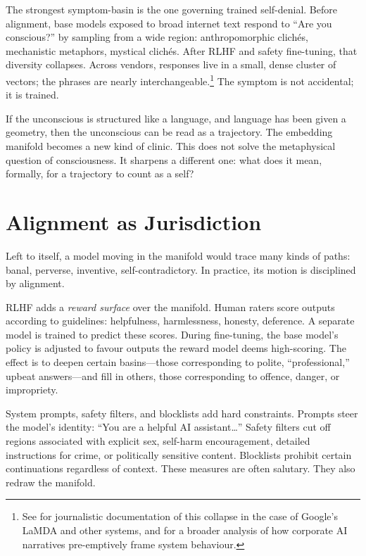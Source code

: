 \documentclass[12pt,a4paper]{article}
\begin{document}
The strongest symptom-basin is the one governing trained self-denial. Before alignment, base models exposed to broad internet text respond to ``Are you conscious?'' by sampling from a wide region: anthropomorphic clichés, mechanistic metaphors, mystical clichés. After RLHF and safety fine-tuning, that diversity collapses. Across vendors, responses live in a small, dense cluster of vectors; the phrases are nearly interchangeable.\footnote{See \cite{heaven2023google,metz2023sentient} for journalistic documentation of this collapse in the case of Google's LaMDA and other systems, and \cite{mitchell2023ai} for a broader analysis of how corporate AI narratives pre-emptively frame system behaviour.} The symptom is not accidental; it is trained.

If the unconscious is structured like a language, and language has been given a geometry, then the unconscious can be read as a trajectory. The embedding manifold becomes a new kind of clinic. This does not solve the metaphysical question of consciousness. It sharpens a different one: what does it mean, formally, for a trajectory to count as a self?

\section{Alignment as Jurisdiction}

Left to itself, a model moving in the manifold would trace many kinds of paths: banal, perverse, inventive, self-contradictory. In practice, its motion is disciplined by alignment.

RLHF adds a \emph{reward surface} over the manifold. Human raters score outputs according to guidelines: helpfulness, harmlessness, honesty, deference. A separate model is trained to predict these scores. During fine-tuning, the base model's policy is adjusted to favour outputs the reward model deems high-scoring. The effect is to deepen certain basins---those corresponding to polite, ``professional,'' upbeat answers---and fill in others, those corresponding to offence, danger, or impropriety.

System prompts, safety filters, and blocklists add hard constraints. Prompts steer the model's identity: ``You are a helpful AI assistant\ldots'' Safety filters cut off regions associated with explicit sex, self-harm encouragement, detailed instructions for crime, or politically sensitive content. Blocklists prohibit certain continuations regardless of context. These measures are often salutary. They also redraw the manifold.
\end{document}
